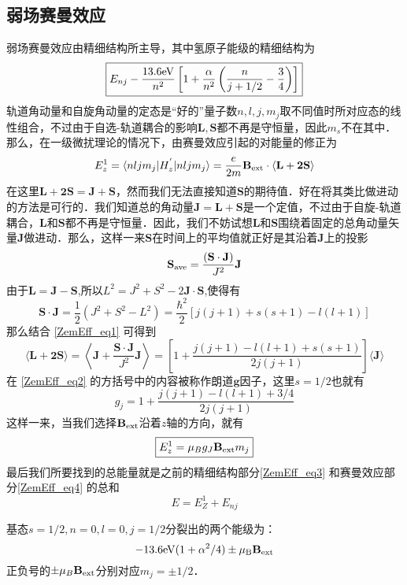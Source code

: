 \subsection{弱场赛曼效应}
弱场赛曼效应由精细结构所主导，其中氢原子能级的精细结构为\begin{equation}\label{ZemEff_eq3}
\boxed{E_{nj}-\frac{13.6\rm{eV}}{n^2}\left[1+\frac{\alpha}{n^2}\left(\frac{n}{j+1/2}-\frac{3}{4}\right)\right]}
\end{equation}
轨道角动量和自旋角动量的定态是“好的”量子数$n,l,j,m_j$取不同值时所对应态的线性组合，不过由于自选-轨道耦合的影响$\mathbf{L,S}$都不再是守恒量，因此$m_s$不在其中．那么，在一级微扰理论的情况下，由赛曼效应引起的对能量的修正为
$$
E_z^{1}=\langle nljm_j|H_z^{'}|nljm_j\rangle=\frac{e}{2m}\mathbf{B}_{\rm{ext}}\cdot\langle\mathbf{L+2S}\rangle
$$
在这里$\mathbf{L+2S=J+S}$，然而我们无法直接知道$\mathbf{S}$的期待值．好在将其类比做进动的方法是可行的．我们知道总的角动量$\mathbf{J=L+S}$是一个定值，不过由于自旋-轨道耦合，$\mathbf{L}$和$\mathbf{S}$都不再是守恒量．因此，我们不妨试想$\mathbf{L}$和$\mathbf{S}$围绕着固定的总角动量矢量$\mathbf{J}$做进动．那么，这样一来$\mathbf{S}$在时间上的平均值就正好是其沿着$\mathbf{J}$上的投影
\begin{equation}\label{ZemEff_eq1}
\mathbf{S}_{\rm{ave}}=\frac{(\mathbf{S\cdot J})}{J^2}\mathbf{J}
\end{equation}
由于$\mathbf{L=J-S}$,所以$L^2=J^2+S^2-2\mathbf{J\cdot S}$,使得有
\begin{equation}
\mathbf{S\cdot J}=\frac{1}{2}(J^2+S^2-L^2)=\frac{\hbar^2}{2}[j(j+1)+s(s+1)-l(l+1)]
\end{equation}
那么结合 \autoref{ZemEff_eq1} 可得到
\begin{equation}\label{ZemEff_eq2}
\langle \mathbf{L+2S}\rangle =\left\langle \mathbf{J}+\frac{\mathbf{S\cdot J}}{J^2}\mathbf{J}\right\rangle=\left[1+\frac{j(j+1)-l(l+1)+s(s+1)}{2j(j+1)}\right]\langle\mathbf{J}\rangle
\end{equation}
在 \autoref{ZemEff_eq2} 的方括号中的内容被称作朗道$\mathbf{g}$因子，这里$s=1/2$也就有
\begin{equation}
g_j=1+\frac{j(j+1)-l(l+1)+3/4}{2j(j+1)}
\end{equation}
这样一来，当我们选择$\mathbf{B}_{\rm{ext}}$沿着$z$轴的方向，就有
\begin{equation}\label{ZemEff_eq4}
\boxed{E^1_z =\mu_Bg_J\mathbf{B}_{\rm{ext}}m_j}
\end{equation}
最后我们所要找到的总能量就是之前的精细结构部分\autoref{ZemEff_eq3} 和赛曼效应部分\autoref{ZemEff_eq4} 的总和
\begin{equation}
\boxed{E=E_Z^1+E_{nj}}
\end{equation}
\begin{example}{}
基态$s=1/2,n=0,l=0,j=1/2$分裂出的两个能级为：
\begin{equation}
-13.6\rm{eV}(1+\alpha^2/4)\pm\mu_B\mathbf{B}_{\rm{ext}}\notag
\end{equation}
正负号的$\pm\mu_B\mathbf{B}_{\rm{ext}}$分别对应$m_j=\pm1/2$．
\end{example}
